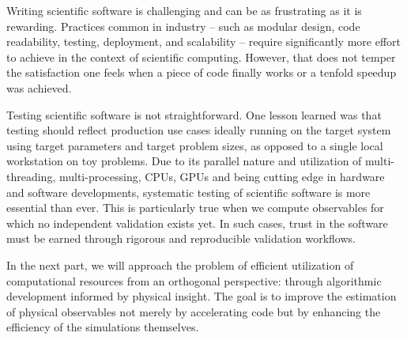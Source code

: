 Writing scientific software is challenging and can be as frustrating as it is rewarding.
Practices common in industry -- such as modular design, code readability, testing, deployment, and scalability -- require significantly more effort to achieve in the context of scientific computing.
However, that does not temper the satisfaction one feels when a piece of code finally works or a tenfold speedup was achieved.

Testing scientific software is not straightforward.
One lesson learned was that testing should reflect production use cases ideally running on the target system using target parameters and target problem sizes, as opposed to a single local workstation on toy problems.
Due to its parallel nature and utilization of multi-threading, multi-processing, CPUs, GPUs and being cutting edge in hardware and software developments, systematic testing of scientific software is more essential than ever.
This is particularly true when we compute observables for which no independent validation exists yet.
In such cases, trust in the software must be earned through rigorous and reproducible validation workflows.

In the next part, we will approach the problem of efficient utilization of computational resources from an orthogonal perspective: through algorithmic development informed by physical insight.
The goal is to improve the estimation of physical observables not merely by accelerating code but by enhancing the efficiency of the simulations themselves.

